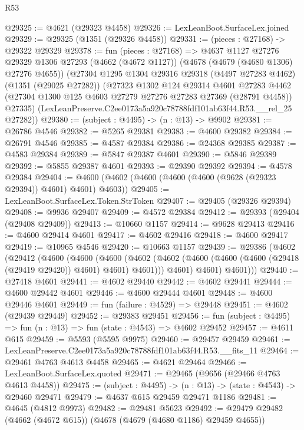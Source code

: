 \begin{lexlean}{R53}
\begin{coremodule}
@29325 := @4621 (@29323 @4458)
@29326 := LexLeanBoot.SurfaceLex.joined
@29329 := @29325 (@1351 (@29326 @4458))
@29331 := (pieces : @27168) -> @29322 @29329
@29378 := fun (pieces : @27168) =>
  @4637
    @1127
    @27276
    @29329
    @1306
    @27293
    (@4662 (@4672 @1127))
    (@4678 (@4679 (@4680 @1306) @27276 @4655))
    (@27304
      @1295
      @1304
      @29316
      @29318
      (@4497 @27283 @4462)
      (@1351 (@29025 @27282))
      (@27323
        @1302
        @124
        @29314
        @4601
        @27283
        @4462
        (@27304 @1300 @125 @4603 @27279 @27276 @27283 @27369 (@28791 @4458))
        @27335)
      (LexLeanPreserve.C2ee0173a5a920c78788fdf101ab63f44.R53.__rel_25 @27282))
@29380 := (subject : @4495) -> (n : @13) -> @9902
@29381 := @26786 @4546
@29382 := @5265 @29381
@29383 := @4600 @29382
@29384 := @26791 @4546
@29385 := @4587 @29384
@29386 := @24368 @29385
@29387 := @4583 @29384
@29389 := @5847 @29387 @4601
@29390 := @5846 @29389
@29392 := @5855 @29387 @4601
@29393 := @29390 @29392
@29394 := @4578 @29384
@29404 := @4600 (@4602 (@4600 (@4600 (@4600 (@9628 (@29323 @29394)) @4601) @4601) @4603))
@29405 := LexLeanBoot.SurfaceLex.Token.StrToken
@29407 := @29405 (@29326 @29394)
@29408 := @9936 @29407
@29409 := @4572 @29384
@29412 := @29393 (@29404 (@29408 @29409))
@29413 := @10660 @1157
@29414 := @9628 @29413
@29416 := @4600 @29414 @4601
@29417 := @4602 @29416
@29418 := @4600 @29417
@29419 := @10965 @4546
@29420 := @10663 @1157
@29439 := @29386
    (@4602
      (@29412
        (@4600
          (@4600
            (@4600
              (@4602 (@4602 (@4600 (@4600 (@4600 (@29418 (@29419 @29420)) @4601) @4601) @4601)))
              @4601)
            @4601)
          @4601)))
@29440 := @27418 @4601
@29441 := @4602 @29440
@29442 := @4602 @29441
@29444 := @4600 @29442 @4601
@29446 := @4600 @29444 @4601
@29448 := @4600 @29446 @4601
@29449 := fun (failure : @4529) => @29448
@29451 := @4602 (@29439 @29449)
@29452 := @29383 @29451
@29456 := fun (subject : @4495) => fun (n : @13) => fun (state : @4543) => @4602 @29452
@29457 := @4611 @615
@29459 := @5593 (@5595 @9975)
@29460 := @29457 @29459
@29461 := LexLeanPreserve.C2ee0173a5a920c78788fdf101ab63f44.R53.__fits_11
@29464 := @29461 @4763 @4613 @4458
@29465 := @4621 @29464
@29466 := LexLeanBoot.SurfaceLex.quoted
@29471 := @29465 (@9656 (@29466 @4763 @4613 @4458))
@29475 := (subject : @4495) -> (n : @13) -> (state : @4543) -> @29460 @29471
@29479 := @4637 @615 @29459 @29471 @1186
@29481 := @4645 (@4812 @9973)
@29482 := @29481 @5623
@29492 := @29479 @29482 (@4662 (@4672 @615)) (@4678 (@4679 (@4680 @1186) @29459 @4655))

\end{coremodule}
\end{lexlean}
